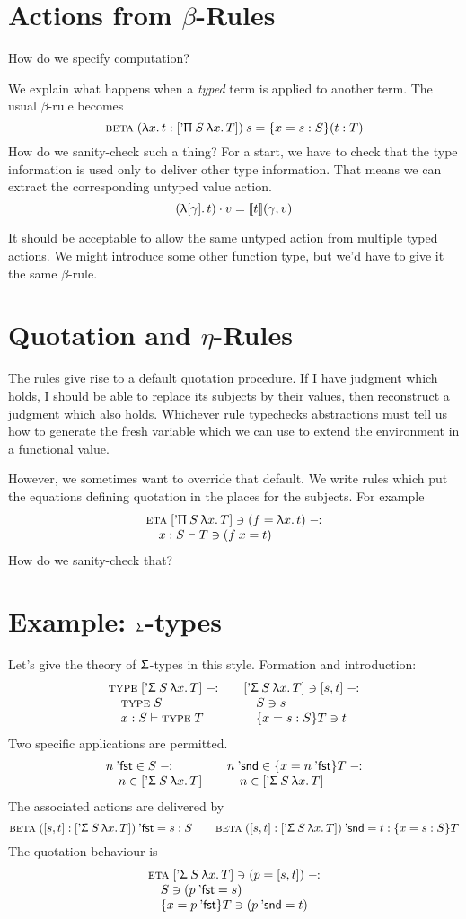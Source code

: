 \documentclass{article}
\begin{document}
\section{Actions from $\beta$-Rules}

How do we specify computation?

\newcommand{\betar}{\textsc{beta}\;} 
We explain what happens when a \emph{typed} term is applied to another term.
The usual $\beta$-rule becomes
\[
\betar (\lam x t : [\quo\Uppi\:S\:\lam x T])\:s =
        \{x = s:S\}(t : T)
\]
How do we sanity-check such a thing? For a start, we have to check that the type information is used only to deliver other type information. That means we can extract the corresponding untyped value action.
\[
  (\uplambda [\gamma].\,t)\cdot v = \llbracket t \rrbracket (\gamma,v)
\]

It should be acceptable to allow the same untyped action from multiple typed actions. We might introduce some other function type, but we'd have to give it the same $\beta$-rule.


\section{Quotation and $\eta$-Rules}

The rules give rise to a default quotation procedure. If I have judgment which holds, I should be able to replace its subjects by their values, then reconstruct a judgment which also holds. Whichever rule typechecks abstractions must tell us how to generate the fresh variable which we can use to extend the environment in a functional value.

\newcommand{\etar}{\textsc{eta}\;} 
However, we sometimes want to override that default. We write rules which
put the equations defining quotation in the places for the subjects.
For example
\[
\lay{\etar [\quo\Uppi\:S\:\lam x T] \ni (f = \lam x t)}
    {x:S \vdash T \ni (f\:x = t)}
\]
How do we sanity-check that?


\section{Example: $\Upsigma$-types}

Let's give the theory of $\Upsigma$-types in this style. Formation and introduction:
\[
\lay{\type[\quo\Upsigma\:S\:\lam x T]}
    {\type S \\ x:S\vdash \type T}
\qquad
\lay{[\quo\Upsigma\:S\:\lam x T] \ni [s, t]}
    {S\ni s\\ \{x=s:S\}T \ni t}
\]
Two specific applications are permitted.
\newcommand{\fst}{\quo\mathsf{fst}}
\newcommand{\snd}{\quo\mathsf{snd}}
\[
\lay{n\:\fst \in S}
  {n\in [\quo\Upsigma\:S\:\lam x T]}
\qquad
\lay{n\:\snd \in \{x=n\:\fst\}T}
  {n\in [\quo\Upsigma\:S\:\lam x T]}
\]
The associated actions are delivered by
\[
\betar ([s, t]:[\quo\Upsigma\:S\:\lam x T])\:\fst = s:S
\qquad
\betar ([s, t]:[\quo\Upsigma\:S\:\lam x T])\:\snd = t:\{x=s:S\}T
\]
The quotation behaviour is
\[
\lay{\etar [\quo\Upsigma\:S\:\lam x T] \ni (p = [s, t])}
  {S\ni (p\:\fst = s)\\ \{x=p\:\fst\}T\ni (p\:\snd = t)}
\]
\end{document}
